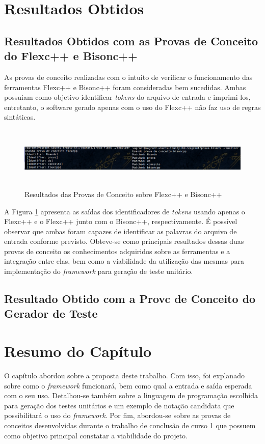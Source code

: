 \section{Resultados Obtidos}
\subsection{Resultados Obtidos com as Provas de Conceito do Flexc++ e Bisonc++}
As provas de conceito realizadas com o intuito de verificar o funcionamento das ferramentas Flexc++ e Bisonc++ foram consideradas bem sucedidas. Ambas possuiam como objetivo identificar \textit{tokens} do arquivo de entrada e imprimi-los, entretanto, o software gerado apenas com o uso do Flexc++ não faz uso de regras sintáticas. 

 \begin{figure}[h]
    \centering
    \includegraphics[width=\textwidth,height=3cm]{figuras/resultadosPCBF.png}
    \caption{Resultados das Provas de Conceito sobre Flexc++ e Bisonc++}
    \label{fig:resultadosPCBF}
 \end{figure}

\par
\indent A Figura \ref{fig:resultadosPCBF} apresenta as saídas dos identificadores de \textit{tokens} usando apenas o Flexc++ e o Flexc++ junto com o Bisonc++, respectivamente. É possível observar que ambas foram capazes de identificar as palavras do arquivo de entrada conforme previsto. Obteve-se como principais resultados dessas duas provas de conceito os conhecimentos adquiridos sobre as ferramentas e a integração entre elas, bem como a viabilidade da utilização das mesmas para implementação do \textit{framework} para geração de teste unitário.

\subsection{Resultado Obtido com a Provc de Conceito do Gerador de Teste}

\section{Resumo do Capítulo}
O capítulo abordou sobre a proposta deste trabalho. Com isso, foi explanado sobre como o \textit{framework} funcionará, bem como qual a entrada e saída esperada com o seu uso. Detalhou-se também sobre a linguagem de programação escolhida para geração dos testes unitários e um exemplo de notação candidata que possibilitará o uso do \textit{framework}. Por fim, abordou-se sobre as provas de conceitos desenvolvidas durante o trabalho de conclusão de curso 1 que possuem como objetivo principal constatar a viabilidade do projeto. 

 